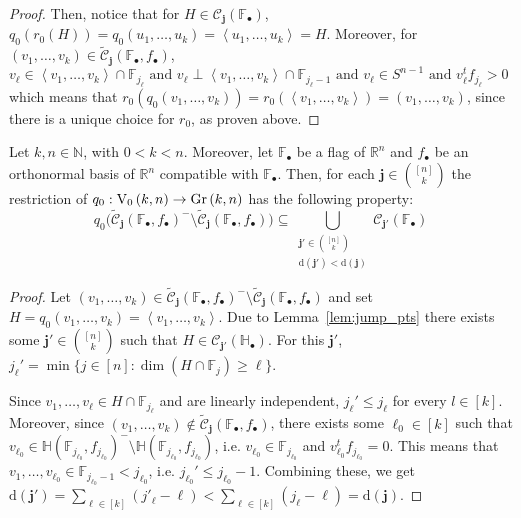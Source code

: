 \begin{proof}
Then, notice that for $H\in\mathcal{C}_{\mathbf{j}}(\mathbb{F}_{\bullet})$,
$q_0(r_0(H))=q_0(u_1,\ldots,u_k)=\left<u_1,\ldots,u_k\right>=H$.
Moreover, for $(v_1,\ldots,v_k)\in\tilde{\mathcal{C}}_{\mathbf{j}}(\mathbb{F}_{\bullet},f_{\bullet})$,
$v_{\ell}\in\left<v_1,\ldots,v_k\right>\cap\mathbb{F}_{j_{\ell}}\text{ and } v_{\ell}\perp\left<v_1,\ldots,v_k\right>\cap\mathbb{F}_{j_{\ell}-1}\text{ and }v_{\ell}\in S^{n-1}\text{ and }v_{\ell}^tf_{j_{\ell}}>0$
which means that
$r_0(q_0(v_1,\ldots,v_k))=r_0(\left<v_1,\ldots,v_k\right>)=(v_1,\ldots,v_k)$,
since there is a unique choice for $r_0$, as proven above.
\end{proof}

\begin{lemma}\label{lem:q0_on_bdr} Let $k,n\in\mathbb{N}$, with $0<k<n$. Moreover, let $\mathbb{F}_{\bullet}$ be a flag of $\mathbb{R}^n$ and $f_{\bullet}$ be an orthonormal basis of $\mathbb{R}^n$ compatible with $\mathbb{F}_{\bullet}$. Then, for each $\mathbf{j}\in\binom{[n]}{k}$ the restriction of $q_0:\StO{k}{n}\to\Gr{k}{n}$ has the following property:
\[q_0\big(\tilde{\mathcal{C}}_{\mathbf{j}}(\mathbb{F}_{\bullet},f_{\bullet})^-\setminus\tilde{\mathcal{C}}_{\mathbf{j}}(\mathbb{F}_{\bullet},f_{\bullet})\big)\subseteq\bigcup_{\substack{\mathbf{j}'\in\binom{[n]}{k}\\\mathrm{d}(\mathbf{j}')<\mathrm{d}(\mathbf{j})}}\mathcal{C}_{\mathbf{j}'}(\mathbb{F}_{\bullet})\]
\end{lemma}
\begin{proof} Let $(v_1,\ldots,v_k)\in\tilde{\mathcal{C}}_{\mathbf{j}}(\mathbb{F}_{\bullet},f_{\bullet})^-\setminus\tilde{\mathcal{C}}_{\mathbf{j}}(\mathbb{F}_{\bullet},f_{\bullet})$ and set $H=q_0(v_1,\ldots,v_k)=\left<v_1,\ldots,v_k\right>$. Due to Lemma~\ref{lem:jump_pts} there exists some $\mathbf{j}'\in\binom{[n]}{k}$ such that $H\in\mathcal{C}_{\mathbf{j}'}(\mathbb{H}_{\bullet})$. For this $\mathbf{j}'$,
$j_{\ell}'=\min\{j\in[n]:\dim(H\cap\mathbb{F}_j)\geq\ell\}$.

Since $v_1,\ldots,v_{\ell}\in H\cap\mathbb{F}_{j_{\ell}}$ and are linearly independent, $j_{\ell}'\leq j_{\ell}$ for every $l\in[k]$. Moreover, since $(v_1,\ldots,v_k)\not\in\tilde{\mathcal{C}}_{\mathbf{j}}(\mathbb{F}_{\bullet},f_{\bullet})$, there exists some $\ell_0\in[k]$ such that $v_{\ell_0}\in\mathbb{H}(\mathbb{F}_{j_{\ell_0}},f_{j_{\ell_0}})^-\setminus\mathbb{H}(\mathbb{F}_{j_{\ell_0}},f_{j_{\ell_0}})$, i.e. $v_{\ell_0}\in\mathbb{F}_{j_{\ell_0}}$ and $v_{\ell_0}^tf_{j_{\ell_0}}=0$. This means that $v_1,\ldots,v_{\ell_0}\in\mathbb{F}_{j_{\ell_0}-1}<j_{\ell_0}$, i.e. $j_{\ell_0}'\leq j_{\ell_0}-1$. Combining these, we get
$\mathrm{d}(\mathbf{j}')=\sum_{\ell\in[k]}(j'_{\ell}-\ell)<\sum_{\ell\in[k]}(j_{\ell}-\ell)=\mathrm{d}(\mathbf{j})$.
\end{proof}

